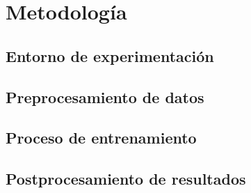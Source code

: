 
\chapter{Metodología}

\section{Entorno de experimentación}
\section{Preprocesamiento de datos}
\section{Proceso de entrenamiento}
\section{Postprocesamiento de resultados}

\endinput
